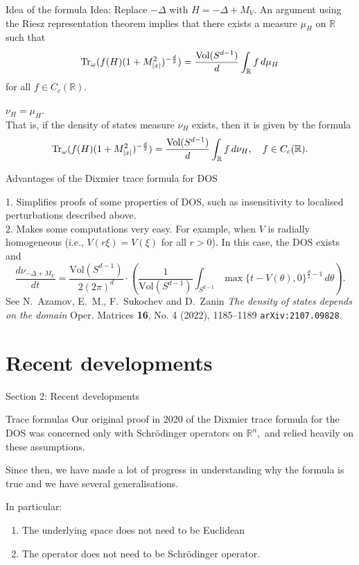 \documentclass{beamer}
\numberwithin{equation}{section}
\theoremstyle{plain}
\theoremstyle{plain}
\theoremstyle{definition}
\theoremstyle{plain}
\theoremstyle{plain}
\theoremstyle{definition}
\newcommand{\tr}{{\rm Tr}}
\newcommand{\Vol}{\mathrm{Vol}}
\newcommand{\Rl}{\mathbb{R}}
\begin{document}
\begin{frame}{Idea of the formula}
    Idea: Replace $-\Delta$ with $H = -\Delta+M_V$. An argument using the Riesz representation theorem implies that there exists a measure $\mu_H$ on $\Rl$ such that 
    $$
        \tr_{\omega}(f(H)(1+M_{|x|}^2)^{-\frac{d}{2}}) = \frac{\Vol(S^{d-1})}{d}\int_{\Rl} f\,d\mu_H
    $$
    for all $f \in C_c(\Rl).$\\
    
    \begin{theorem}
        $\nu_H = \mu_H$.\\
        
        That is, if the density of states measure $\nu_H$ exists, then it is given by the formula
        $$
            \tr_{\omega}(f(H)(1+M_{|x|}^2)^{-\frac{d}{2}}) = \frac{\Vol(S^{d-1})}{d}\int_{\Rl} f\,d\nu_H,\quad f \in C_c(\Rl).
        $$
    \end{theorem}
\end{frame} 


\begin{frame}{Advantages of the Dixmier trace formula for DOS}

1. Simplifies proofs of some properties of DOS, such as insensitivity to localised perturbations described above.\\

2. Makes some computations very easy. For example, when $V$ is radially homogeneous (i.e., $V(r\xi) = V(\xi)$ for all $r>0$). In this case, the DOS exists and
    \[
        \frac{d\nu_{-\Delta+M_V}}{dt} = \frac{\Vol(S^{d-1})}{2(2\pi)^d}\cdot \left(\frac{1}{\mathrm{Vol}(S^{d-1})}\int_{S^{d-1}} \max\{t-V(\theta),0\}^{\frac{d}{2}-1}\,d\theta\right).
    \]
    See N.~Azamov, E.~M., F.~Sukochev and D.~Zanin \emph{The density of states depends on the domain} Oper. Matrices \textbf{16}, No. 4 (2022), 1185--1189 \texttt{arXiv:2107.09828}.
\end{frame}


\section{Recent developments}
\begin{frame}
    \huge{Section 2: Recent developments}
\end{frame}


\begin{frame}{Trace formulas}
    Our original proof in 2020 of the Dixmier trace formula for the DOS was concerned only with Schr\"odinger operators on $\Rl^n,$ and relied heavily on these assumptions.\pause

    Since then, we have made a lot of progress in understanding why the formula is true and we have several generalisations.\pause

    In particular:
    \begin{enumerate}
        \item{} The underlying space does not need to be Euclidean\pause
        \item{} The operator does not need to be Schr\"odinger operator.
    \end{enumerate}

\end{frame}
    
\end{document}
